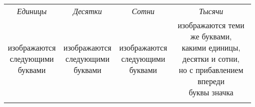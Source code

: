 \documentclass[11pt,a4paper,oneside]{memoir}
\begin{document}
    \begin{center}
        \renewcommand*{\arraystretch}{1.4}    \begin{longtable}{|c|c|c|c|}
            \hline
            \emph{Единицы} & \emph{Десятки} & \emph{Сотни} & \emph{Тысячи}\\
            \scriptsize\makecell{изображаются\\следующими\\буквами} &
            \scriptsize\makecell{изображаются\\следующими\\буквами} &
            \scriptsize\makecell{изображаются\\следующими\\буквами} &
            \scriptsize\makecell{изображаются теми же буквами,\\какими единицы,\\десятки и сотни,\\но с прибавлением впереди\\буквы значка}\\
        
            &&& \huge{\slv{҂}}\\
            

\end{longtable}
\end{center}
\end{document}
